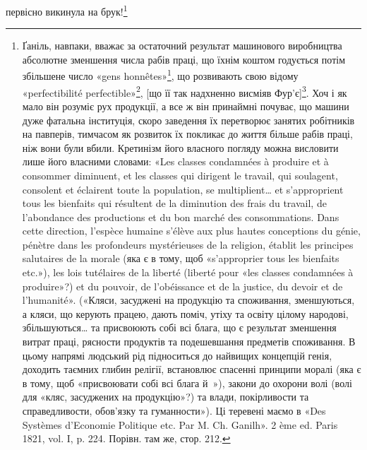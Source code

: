 первісно викинула на брук!\footnote{
Ґаніль, навпаки, вважає за остаточний результат машинового виробництва
абсолютне зменшення числа рабів праці, що їхнім коштом годується
потім збільшене число «gens honnêtes»\footnote*{
— порядних людей. \emph{Ред.}
}, що розвивають свою відому
«perfectibilité perfectible»\footnote*{
— здібну вдосконалюватися здібність до вдосконалення. \emph{Ред.}
}, [що її так надхненно висміяв Фур’є]\footnote*{
Заведений у прямі дужки кінець речення беремо з французького
видання. \emph{Ред.}
}. Хоч і як мало він розуміє рух продукції, а все ж він принаймні почуває,
що машини дуже фатальна інституція, скоро заведення їх перетворює
занятих робітників на павперів, тимчасом як розвиток їх покликає до
життя більше рабів праці, ніж вони були вбили. Кретинізм його власного
погляду можна висловити лише його власними словами: «Les classes
condamnées à produire et à consommer diminuent, et les classes qui dirigent
le travail, qui soulagent, consolent et éclairent toute la population,
se multiplient\dots{} et s’approprient tous les bienfaits qui résultent de la diminution
des frais du travail, de l’abondance des productions et du bon marché
des consommations. Dans cette direction, l’espèce humaine s’élève aux plus
hautes conceptions du génie, pénètre dans les profondeurs mystérieuses de la
religion, établit les principes salutaires de la morale (яка є в тому, щоб «s’approprier
tous les bienfaits etc.»), les lois tutélaires de la liberté (liberté pour
«les classes condamnées à produire»?) et du pouvoir, de l’obéissance et de
la justice, du devoir et de l’humanité». («Кляси, засуджені на продукцію
та споживання, зменшуються, а кляси, що керують працею, дають поміч,
утіху та освіту цілому народові, збільшуються\dots{} та присвоюють собі
всі блага, що є результат зменшення витрат праці, рясности продуктів
та подешевшання предметів споживання. В цьому напрямі людський
рід підноситься до найвищих концепцій генія, доходить таємних глибин
релігії, встановлює спасенні принципи моралі (яка є в тому, щоб «присвоювати
собі всі блага й~»), закони до охорони волі (волі для «кляс,
засуджених на продукцію»?) та влади, покірливости та справедливости,
обов’язку та гуманности»). Ці теревені маємо в «Des Systèmes d’Economie
Politique etc. Par M. Ch. Ganilh». 2 ème ed. Paris 1821, vol. I, p. 224.
Порівн. там же, стор. 212.
}

